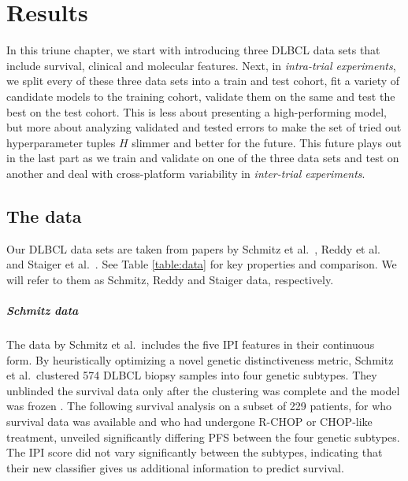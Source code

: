 \chapter{Results} \label{chap:results}

In this triune chapter, we start with introducing three DLBCL data sets that include 
survival, clinical and molecular features. Next, in \textit{intra-trial experiments}, we split 
every of these three data sets into a train and test cohort, fit a variety of candidate models to 
the training cohort, validate them on the same and test the best on the test cohort. This is less 
about presenting a high-performing model, but more about analyzing validated and tested errors to 
make the set of tried out hyperparameter tuples $H$ slimmer and better for the future. This future 
plays out in the last part as we train and validate on one of the three data sets and test on 
another and deal with cross-platform variability in \textit{inter-trial experiments}.

\section{The data}\label{sec:data}

Our DLBCL data sets are taken from papers by Schmitz et al.\ \cite{schmitz18}, Reddy et al.\ 
\cite{reddy17} and Staiger et al.\ \cite{staiger20}. See Table \ref{table:data} for key properties 
and comparison. We will refer to them as Schmitz, Reddy and Staiger data, respectively.



\paragraph{Schmitz data}
The data by Schmitz et al.\ includes the five IPI features in their continuous form. 
By heuristically optimizing a novel genetic distinctiveness metric, Schmitz et al.\ 
clustered \num{574} DLBCL biopsy samples into four genetic subtypes. They 
unblinded the survival data only after the clustering was complete and the 
model was frozen \cite[Appendix 1, pp. 16--18]{schmitz18}. The following survival analysis 
on a subset of \num{229} patients, for who survival data was available and who had undergone R-CHOP 
or CHOP-like treatment, unveiled significantly differing PFS between the four genetic subtypes. The 
IPI score did not vary significantly between the subtypes, 
indicating that their new classifier gives us additional information to predict survival.

